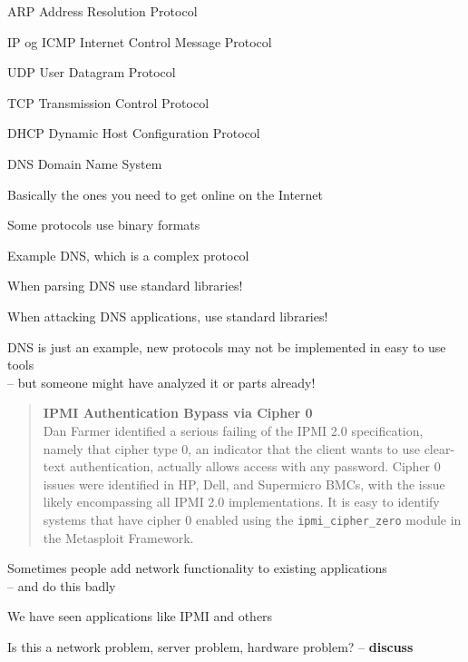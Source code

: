 \documentclass[Screen16to9,17pt]{foils}
\begin{document}


\begin{list1}
\item ARP Address Resolution Protocol
\item IP og ICMP Internet Control Message Protocol
\item UDP User Datagram Protocol
\item TCP Transmission Control Protocol
\item DHCP Dynamic Host Configuration Protocol
\item DNS Domain Name System
\end{list1}
\vskip 1cm
\centerline{Basically the ones you need to get online on the Internet}


\begin{list2}
\item Some protocols use binary formats
\item Example DNS, which is a complex protocol
\item When parsing DNS use standard libraries!
\item When attacking DNS applications, use standard libraries! \smiley
\item DNS is just an example, new protocols may not be implemented in easy to use tools\\ -- but someone might have analyzed it or parts already!
\end{list2}




\begin{quote}{\bf
  IPMI Authentication Bypass via Cipher 0}\\
  Dan Farmer identified a serious failing of the IPMI 2.0 specification, namely that cipher type 0, an indicator that the client wants to use clear-text authentication, actually allows access with any password. Cipher 0 issues were identified in HP, Dell, and Supermicro BMCs, with the issue likely encompassing all IPMI 2.0 implementations. It is easy to identify systems that have cipher 0 enabled using the \verb+ipmi_cipher_zero+ module in the Metasploit Framework.
\end{quote}

\begin{list2}
\item Sometimes people add network functionality to existing applications\\
-- and do this badly
\item We have seen applications like IPMI and others
\item Is this a network problem, server problem, hardware problem? -- {\bf discuss}
\end{list2}
\end{document}

